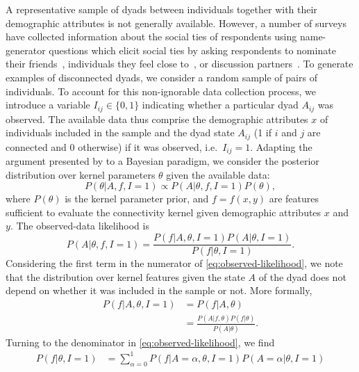 \documentclass{scrartcl}
\newcommand{\observed}[1]{#1}
\begin{document}
\begin{refsection}
A representative sample of dyads between individuals together with their demographic attributes is not generally available. However, a number of surveys have collected information about the social ties of respondents using name-generator questions which elicit social ties by asking respondents to nominate their friends~\cite{Kalmijn2007}, individuals they feel close to~\cite{Hipp2009}, or discussion partners~\cite{Marsden1987,McPherson2006}. To generate examples of disconnected dyads, we consider a random sample of pairs of individuals. To account for this non-ignorable data collection process, we introduce a variable $I_{ij}\in\{0,1\}$ indicating whether a particular dyad $A_{ij}$ was observed. The available data thus comprise the demographic attributes $x$ of individuals included in the sample and the dyad state $A_{ij}$ (1 if $i$ and $j$ are connected and $0$ otherwise) if it was observed, i.e.\ $I_{ij}=1$. Adapting the argument presented by \textcite{King2001} to a Bayesian paradigm, we consider the posterior distribution over kernel parameters $\theta$ given the available data:
\begin{equation}
    P(\theta|\observed{A}, \observed{f}, I=1)\propto P(\observed{A}|\theta,\observed{f},I=1)P(\theta),\label{eq:parameter-posterior}
\end{equation}
where $P(\theta)$ is the kernel parameter prior, and $f=f(x,y)$ are features sufficient to evaluate the connectivity kernel given demographic attributes $x$ and $y$. The observed-data likelihood is
\begin{equation}
    P(\observed{A}|\theta,\observed{f},I=1)=\frac{P(\observed{f}|\observed{A},\theta,I=1)P(\observed{A}|\theta,I=1)}{P(\observed{f}|\theta,I=1)}.\label{eq:observed-likelihood}
\end{equation}
Considering the first term in the numerator of \cref{eq:observed-likelihood}, we note that the distribution over kernel features given the state $A$ of the dyad does not depend on whether it was included in the sample or not. More formally,
\begin{align}
    P(f|A,\theta,I=1)&=P(f|A,\theta)\\
    &=\frac{P(A|f,\theta)P(f|\theta)}{P(A|\theta)}.\label{eq:conditional-equivalence}
\end{align}
Turning to the denominator in \cref{eq:observed-likelihood}, we find
\begin{align}
    P(f|\theta,I=1)&=\sum_{\alpha=0}^1 P(f|A=\alpha,\theta,I=1)P(A=\alpha|\theta,I=1)\nonumber\\

\end{align}
\end{refsection}
\end{document}
